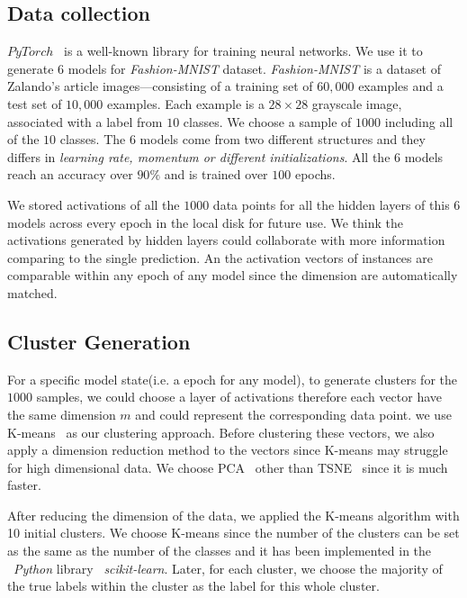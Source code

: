 \documentclass[11pt, twocolumn]{article}
\begin{document}
\subsection{Data collection}
$PyTorch$~\cite{paszke2017automatic} is a well-known library for training neural networks.  We use it to generate 6 models for \emph{Fashion-MNIST} dataset. \emph{Fashion-MNIST} is a dataset of Zalando's article images—consisting of a training set of $60,000$ examples and a test set of $10,000$ examples. Each example is a $28 \times 28$ grayscale image, associated with a label from $10$ classes. We choose a sample of $1000$ including all of the $10$ classes. The 6 models come from two different structures and they differs in \emph{learning rate, momentum or different initializations}. All the 6 models reach an accuracy over $90\%$ and is trained over $100$ epochs.

We stored activations of all the $1000$ data points for all the hidden layers of this 6 models  across every epoch in the local disk for future use. We think the activations generated by hidden layers could collaborate with more information comparing to the single prediction. An the activation vectors of instances are comparable within any epoch of any model since the dimension are automatically matched.

\subsection{Cluster Generation}
For a specific model state(i.e. a epoch for any model), to generate clusters for the $1000$ samples, we could choose a layer of activations therefore each vector have the same dimension $m$ and could represent the corresponding data point.  we use K-means~\cite{macqueen1967} as our clustering approach. Before clustering these vectors, we also apply a dimension reduction method to the vectors since K-means may struggle for high dimensional data. We choose PCA~\cite{jolliffe86} other than TSNE~\cite{vanDerMaaten2008} since it is much faster.

After reducing the dimension of the data, we applied the K-means algorithm with 10 initial clusters. We choose K-means since the number of the clusters can be set as the same as the number of the classes and it has been implemented in the ~\emph{Python} library ~\emph{scikit-learn}. Later, for each cluster, we choose the majority of the true labels within the cluster as the label for this whole cluster.  
\end{document}

